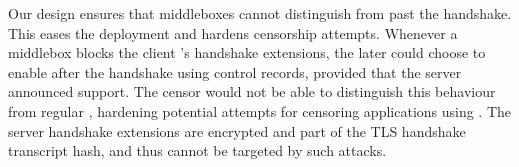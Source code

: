 Our design ensures that middleboxes cannot distinguish \tcpls from \tls past the
handshake. This eases the \tcpls deployment and hardens censorship attempts.
Whenever a middlebox blocks the client \tcpls's handshake extensions, the later
could choose to enable \tcpls after the handshake using \tcpls control records,
provided that the server announced \tcpls support.  The censor would not be able
to distinguish this behaviour from regular \tls, hardening potential
attempts for censoring applications using \tcpls. The server handshake
extensions are encrypted and part of the TLS handshake transcript hash,  and 
thus cannot be targeted by such attacks.








